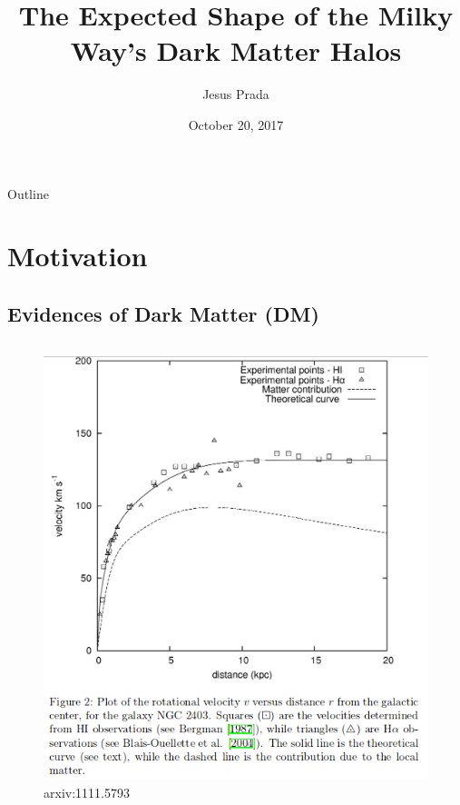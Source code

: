 \documentclass[xcolor=dvipsnames]{beamer}
\title{\textbf{The Expected Shape of the Milky Way's Dark Matter Halos }}
\author{Jesus Prada}
\institute[{\color{Black} Universidad de los Andes}] %
{
 \normalsize Advisors:\\
 PhD Jaime E. Forero-Romero \\ \small Universidad de los Andes, Departamento de Física\\
  \vspace{5mm}
 \normalsize PhD Volker Springel \\ \small  Heidelberg's Institute of Theoretical studies
}
\date{ \footnotesize October 20, 2017}
\begin{document}
\begin{frame}
  \titlepage
\end{frame}
\begin{frame}{Outline}
 \tableofcontents
\end{frame}
\section{Motivation}
\subsection{Evidences of Dark Matter (DM)}
\begin{frame}

\begin{columns}[c]

\begin{column}{.5\textwidth}
\begin{figure}
\includegraphics[width=1\linewidth]{./pics/RotationCurves.png}
\caption{\tiny arxiv:1111.5793}
\end{figure}
\end{column}


\end{columns}
\end{frame}
\end{document}
